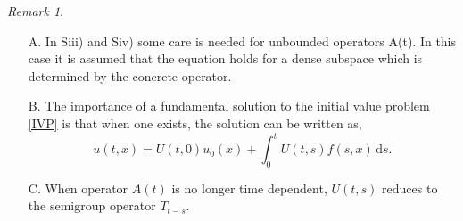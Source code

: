 \documentclass[a4paper, 12pt]{report}
\theoremstyle{cor}
\theoremstyle{remark}
\newtheorem{remark}[theorem]{Remark}
\theoremstyle{definition}
\begin{document}
\begin{remark}\label{TDSFSR1}
\hspace{0.5cm}
\begin{itemize}
\item[A.] In Siii) and Siv) some care is needed for unbounded operators A(t). In this case it is assumed that the equation holds for a dense subspace which is determined by the concrete operator.

\item[B.] The importance of a fundamental solution to the initial value problem \eqref{IVP} is that when one exists, the solution can be written as,
$$
u(t, x) = U(t, 0)u_0(x) + \int_0^tU(t, s)f(s, x)\,\mathrm{d}s.
$$

\item[C.] When operator $A(t)$ is no longer time dependent, $U(t, s)$ reduces to the semigroup operator $T_{t - s}$.
\end{itemize}
\end{remark}
\end{document}
